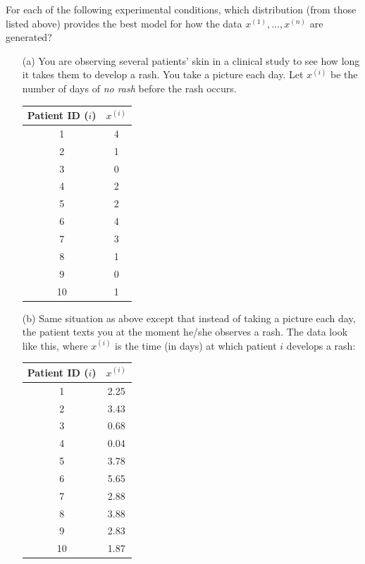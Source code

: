 \begin{question}{}
For each of the following experimental conditions, which distribution (from those listed above) provides the best model for how the data $x^{(1)},\dots,x^{(n)}$ are generated?
    \begin{enumerate}
    \item[(a)] You are observing several patients' skin in a clinical study to see how long it takes them to develop a rash. You take a picture each day. Let $x^{(i)}$ be the number of days of \emph{no rash} before the rash occurs.

\begin{center}{\small
\begin{tabular}{cc}
\toprule
Patient ID ($i$) & $x^{(i)}$ \\
\midrule
1 & 4 \\
2 & 1 \\
3 & 0 \\
4 & 2 \\
5 & 2 \\
6 & 4 \\
7 & 3 \\
8 & 1 \\
9 & 0 \\
10 & 1 \\
\end{tabular}}
\end{center}

    \item[(b)] Same situation as above except that instead of taking a picture each day, the patient texts you at the moment he/she observes a rash. The data look like this, where $x^{(i)}$ is the time (in days) at which patient $i$ develops a rash: 

\begin{center}{\small
\begin{tabular}{cc}
\toprule
Patient ID ($i$) & $x^{(i)}$ \\
\midrule
1 & 2.25 \\
2 & 3.43\\
3 & 0.68\\
4 & 0.04\\
5 & 3.78\\
6 & 5.65\\
7 & 2.88\\
8 & 3.88\\
9 & 2.83\\
10 & 1.87\\
\end{tabular}}
\end{center}
 

\end{enumerate}
\end{question}

